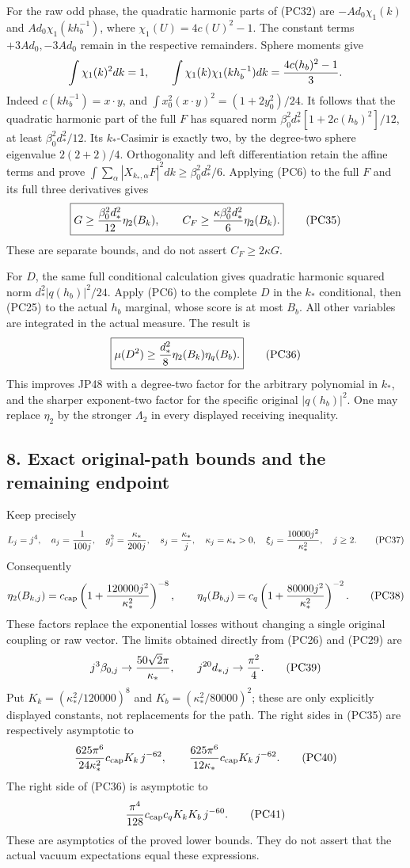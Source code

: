 \documentclass[11pt]{article}
\begin{document}
For the raw odd phase, the quadratic harmonic parts of (PC32) are
\(-Ad_0\chi_1(k)\) and \(Ad_0\chi_1(kh_b^{-1})\), where
\(\chi_1(U)=4c(U)^2-1\). The constant terms
\(+3Ad_0,-3Ad_0\) remain in the respective remainders.
Sphere moments give
\[
 \int\chi_1(k)^2dk=1,\qquad
 \int\chi_1(k)\chi_1(kh_b^{-1})dk={4c(h_b)^2-1\over3}.
\]
Indeed \(c(kh_b^{-1})=x\cdot y\), and
\(\int x_0^2(x\cdot y)^2=(1+2y_0^2)/24\).
It follows that the quadratic harmonic part of the full \(F\) has
squared norm
\(\beta_0^2d_*^2[1+2c(h_b)^2]/12\), at least
\(\beta_0^2d_*^2/12\). Its \(k_*\)-Casimir is exactly two,
by the degree-two sphere eigenvalue \(2(2+2)/4\). Orthogonality
and left differentiation retain the affine terms and prove
\(\int\sum_\alpha|X_{k_*,\alpha}F|^2dk
\ge\beta_0^2d_*^2/6\).
Applying (PC6) to the full \(F\) and its full three derivatives gives
\[
 \boxed{\displaystyle
 G\ge{\beta_0^2d_*^2\over12}\eta_2(B_k),\qquad
 C_F\ge{\kappa\beta_0^2d_*^2\over6}\eta_2(B_k).}
 \tag{PC35}
\]
These are separate bounds, and do not assert \(C_F\ge2\kappa G\).

For \(D\), the same full conditional calculation gives quadratic
harmonic squared norm \(d_*^2|q(h_b)|^2/24\).
Apply (PC6) to the complete \(D\) in the \(k_*\) conditional,
then (PC25) to the actual \(h_b\) marginal, whose score is at most
\(B_b\). All other variables are integrated in the actual measure.
The result is
\[
 \boxed{\displaystyle
 \mu(D^2)\ge{d_*^2\over8}\eta_2(B_k)\eta_q(B_b).}
 \tag{PC36}
\]
This improves JP48 with a degree-two factor for the arbitrary
polynomial in \(k_*\), and the sharper exponent-two factor for the
specific original \(|q(h_b)|^2\). One may replace \(\eta_2\) by
the stronger \(\Lambda_2\) in every displayed receiving inequality.

\subsection*{8. Exact original-path bounds and the remaining endpoint}

Keep precisely
\[
 L_j=j^4,\quad a_j={1\over100j},\quad
 g_j^2={\kappa_*\over200j},\quad s_j={\kappa_*\over j},
 \quad \kappa_j=\kappa_*>0,\quad
 \xi_j={10000j^2\over\kappa_*^2},\quad j\ge2 .
 \tag{PC37}
\]
Consequently
\[
 \eta_2(B_{k,j})
 =c_{\rm cap}\left(1+{120000j^2\over\kappa_*^2}\right)^{-8},
 \qquad
 \eta_q(B_{b,j})
 =c_q\left(1+{80000j^2\over\kappa_*^2}\right)^{-2}.
 \tag{PC38}
\]
These factors replace the exponential losses without changing a
single original coupling or raw vector. The limits obtained directly
from (PC26) and (PC29) are
\[
 j^3\beta_{0,j}\to{50\sqrt2\pi\over\kappa_*},\qquad
 j^{20}d_{*,j}\to{\pi^2\over4}.
 \tag{PC39}
\]
Put \(K_k=(\kappa_*^2/120000)^8\) and
\(K_b=(\kappa_*^2/80000)^2\); these are only explicitly displayed
constants, not replacements for the path. The right sides in (PC35)
are respectively asymptotic to
\[
 {625\pi^6\over24\kappa_*^2}c_{\rm cap}K_k\,j^{-62},
 \qquad
 {625\pi^6\over12\kappa_*}c_{\rm cap}K_k\,j^{-62}.
 \tag{PC40}
\]
The right side of (PC36) is asymptotic to
\[
 {\pi^4\over128}c_{\rm cap}c_qK_kK_b\,j^{-60}.
 \tag{PC41}
\]
These are asymptotics of the proved lower bounds. They do not assert
that the actual vacuum expectations equal these expressions.
\end{document}
